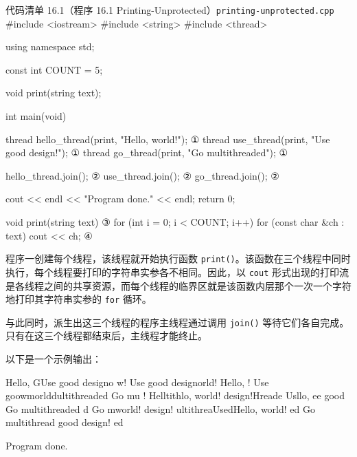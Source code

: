 \begin{codeboxt}{代码清单 16.1（程序 16.1 Printing-Unprotected）\texttt{printing-unprotected.\allowbreak{}cpp}}
#include <iostream>
#include <string>
#include <thread>

using namespace std;

const int COUNT = 5;

void print(string text);

int main(void)
{
    thread hello_thread(print, "Hello, world!\n");   ①
    thread use_thread(print, "Use good design!\n");  ①
    thread go_thread(print, "Go multithreaded\n");   ①

    hello_thread.join();                             ②
    use_thread.join();                               ②
    go_thread.join();                                ②

    cout << endl << "Program done." << endl;
    return 0;
}

void print(string text)                              ③
{
    for (int i = 0; i < COUNT; i++)
    {
        for (const char &ch : text) cout << ch;      ④
    }
}
\end{codeboxt}
\par
{}\par
{}\par
{}\par

程序一创建每个线程，该线程就开始执行函数 \texttt{print()}。该函数在三个线程中同时执行，每个线程要打印的字符串实参各不相同。因此，以 \texttt{cout} 形式出现的打印流是各线程之间的共享资源，而每个线程的临界区就是该函数内层那个一次一个字符地打印其字符串实参的 \texttt{for} 循环。

与此同时，派生出这三个线程的程序主线程通过调用 \texttt{join()} 等待它们各自完成。只有在这三个线程都结束后，主线程才能终止。

以下是一个示例输出：

\begin{codebox}
Hello, GUse good designo w!
Use good designorld!
Hello, !
Use goowmorlddultithreaded
Go mu !
Helltithlo, world!
design!Hreade
Usllo, ee good
Go multithreaded
d Go mworld!
design!
ultithreaUsedHello, world!
ed
Go multithread good design!
ed

Program done.
\end{codebox}

